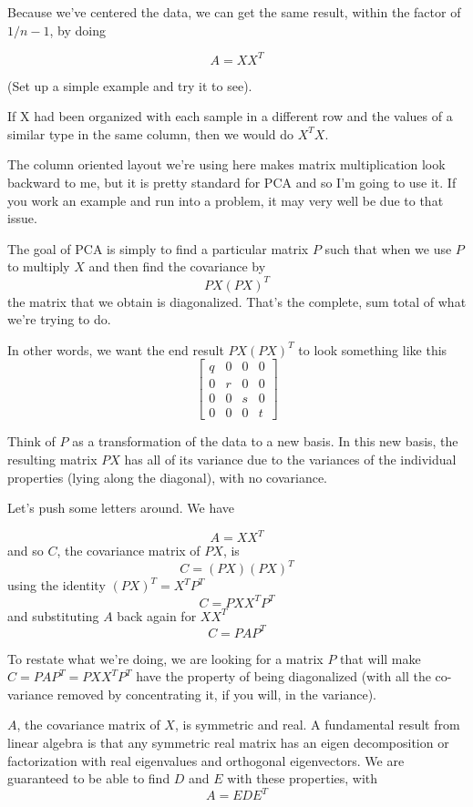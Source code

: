 \documentclass[11pt, oneside]{article}
\begin{document}
Because we've centered the data, we can get the same result, within the factor of $1/n-1$, by doing

\[ A = X X^T  \]

(Set up a simple example and try it to see).

If X had been organized with each sample in a different row and the values of a similar type in the same column, then we would do $X^T X$.  

The column oriented layout we're using here makes matrix multiplication look backward to me, but it is pretty standard for PCA and so I'm going to use it.  If you work an example and run into a problem, it may very well be due to that issue.

The goal of PCA is simply to find a particular matrix $P$ such that when we use $P$ to multiply $X$ and then find the covariance by
\[ PX (PX)^T \]
the matrix that we obtain is diagonalized.  That's the complete, sum total of what we're trying to do.

In other words, we want the end result $PX (PX)^T$ to look something like this
\[
\begin{bmatrix}
q & 0 & 0 & 0 \\
0 & r & 0 & 0 \\
0 & 0 & s & 0 \\
0 & 0 & 0 & t
\end{bmatrix}
\]

Think of $P$ as a transformation of the data to a new basis.  In this new basis, the resulting matrix $PX$ has all of its variance due to the variances of the individual properties (lying along the diagonal), with no covariance.

Let's push some letters around.  We have

\[ A = X X^T \]
and so $C$, the covariance matrix of $PX$, is
\[ C = (PX) (PX)^T  \]
using the identity $(PX)^T = X^TP^T$
\[ C = P X X^T P^T \]
and substituting $A$ back again for $X X^T$
\[ C = P A P^T \]

To restate what we're doing, we are looking for a matrix $P$ that will make $C = P A P^T = P X X^T P^T$ have the property of being diagonalized (with all the co-variance removed by concentrating it, if you will, in the variance).

$A$, the covariance matrix of $X$, is symmetric and real.  A fundamental result from linear algebra is that any symmetric real matrix has an eigen decomposition or factorization with real eigenvalues and orthogonal eigenvectors.  We are guaranteed to be able to find $D$ and $E$ with these properties, with
\[ A = E D E^T \]
\end{document}
